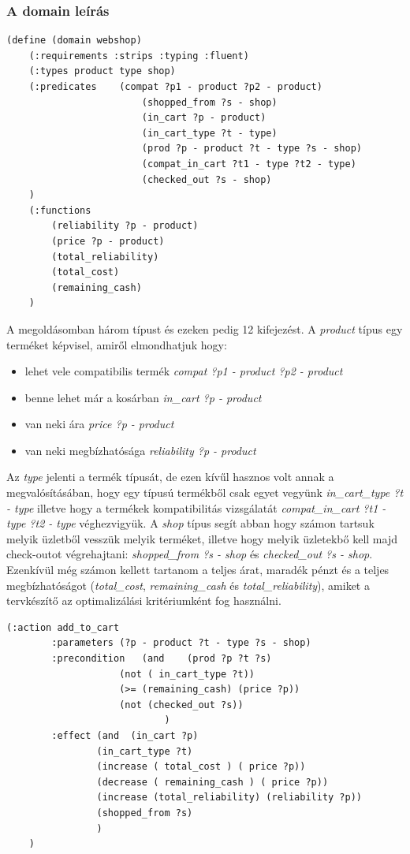 \subsubsection{A domain leírás}
\begin{lstlisting}[frame=single,float=!ht]
(define (domain webshop)
	(:requirements :strips :typing :fluent)
	(:types product type shop)
	(:predicates	(compat ?p1 - product ?p2 - product)
						(shopped_from ?s - shop)
						(in_cart ?p - product)
						(in_cart_type ?t - type)
						(prod ?p - product ?t - type ?s - shop)
						(compat_in_cart ?t1 - type ?t2 - type)
						(checked_out ?s - shop)
	)
	(:functions
		(reliability ?p - product)
		(price ?p - product)
		(total_reliability)
		(total_cost)
		(remaining_cash)
	)
\end{lstlisting}
A megoldásomban három típust és ezeken pedig 12 kifejezést. A \emph{product} típus egy terméket képvisel, amiről elmondhatjuk hogy:
\begin{itemize}
\item lehet vele compatibilis termék \emph{compat ?p1 - product ?p2 - product}
\item benne lehet már a kosárban \emph{in\_cart ?p - product}
\item van neki ára \emph{price ?p - product}
\item van neki megbízhatósága \emph{reliability ?p - product}
\end{itemize}
Az \emph{type} jelenti a termék típusát, de ezen kívűl hasznos volt annak a megvalósításában, hogy egy típusú termékből csak egyet vegyünk \emph{in\_cart\_type ?t - type} illetve hogy a termékek kompatibilitás vizsgálatát \emph{compat\_in\_cart ?t1 - type ?t2 - type} véghezvigyük.
A \emph{shop} típus segít abban hogy számon tartsuk melyik üzletből vesszük melyik terméket, illetve hogy melyik üzletekbő kell majd check-outot végrehajtani: \emph{shopped\_from ?s - shop} és \emph{checked\_out ?s - shop}.
Ezenkívül még számon kellett tartanom a teljes árat, maradék pénzt és a teljes megbízhatóságot (\emph{total\_cost}, \emph{remaining\_cash} és \emph{total\_reliability}), amiket a tervkészítő az optimalizálási kritériumként fog használni.
\begin{lstlisting}[frame=single,float=!ht]						
	(:action add_to_cart
		:parameters	(?p - product ?t - type ?s - shop)
		:precondition	(and 	(prod ?p ?t ?s)
					(not ( in_cart_type ?t))
					(>= (remaining_cash) (price ?p))
					(not (checked_out ?s))
							)
		:effect	(and  (in_cart ?p)
				(in_cart_type ?t)
				(increase ( total_cost ) ( price ?p))
				(decrease ( remaining_cash ) ( price ?p))
				(increase (total_reliability) (reliability ?p))
				(shopped_from ?s)
				)
	)
\end{lstlisting}
